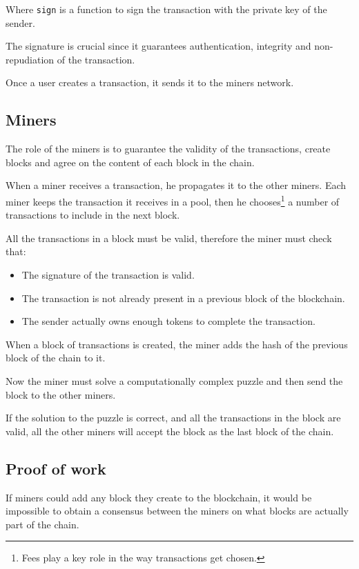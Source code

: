 \documentclass[12pt]{article}
\begin{document}
Where \verb|sign| is a function to sign the transaction with the private key of the sender.

The signature is crucial since it guarantees authentication, integrity and non-repudiation of the transaction.

Once a user creates a transaction, it sends it to the miners network.

\subsection{Miners} \label{subsection:miners}
The role of the miners is to guarantee the validity of the transactions, create blocks and agree on the content of each block in the chain.

When a miner receives a transaction, he propagates it to the other miners. Each miner keeps the transaction it receives in a pool, then he chooses\footnote{Fees \cite{bitcoin_fees} play a key role in the way transactions get chosen.} a number of transactions to include in the next block.

All the transactions in a block must be valid, therefore the miner must check that:
\begin{itemize}
    \item The signature of the transaction is valid.
    \item The transaction is not already present in a previous block of the blockchain.
    \item The sender actually owns enough tokens to complete the transaction.
\end{itemize}

When a block of transactions is created, the miner adds the hash of the previous block of the chain to it.

Now the miner must solve a computationally complex puzzle and then send the block to the other miners.

If the solution to the puzzle is correct, and all the transactions in the block are valid, all the other miners will accept the block as the last block of the chain.

\subsection{Proof of work} \label{subsection:pow}
If miners could add any block they create to the blockchain, it would be impossible to obtain a consensus between the miners on what blocks are actually part of the chain.
\end{document}
